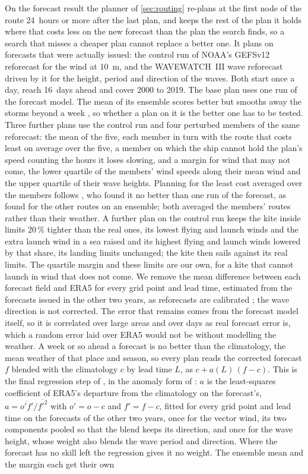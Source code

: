 On the forecast result the planner of \cref{sec:routing} re-plans at the first node of the route 24~hours or more after the last plan, and keeps the rest of the plan it holds where that costs less on the new forecast than the plan the search finds, so a search that misses a cheaper plan cannot replace a better one. It plans on forecasts that were actually issued: the control run of NOAA's GEFSv12 reforecast \citep{guan2022} for the wind at 10~m, and the WAVEWATCH~III wave reforecast driven by it \citep{campos2024} for the height, period and direction of the waves. Both start once a day, reach 16~days ahead and cover 2000 to 2019. The base plan uses one run of the forecast model. The mean of its ensemble scores better but smooths away the storms beyond a week \citep{campos2024}, so whether a plan on it is the better one has to be tested. Three further plans use the control run and four perturbed members of the same reforecast: the mean of the five, each member in turn with the route that costs least on average over the five, a member on which the ship cannot hold the plan's speed counting the hours it loses slowing, and a margin for wind that may not come, the lower quartile of the members' wind speeds along their mean wind and the upper quartile of their wave heights. Planning for the least cost averaged over the members follows \citet{hoffschildt1999}, who found it no better than one run of the forecast, as \citet{saetra2004} found for the other routes on an ensemble; both averaged the members' routes rather than their weather. A further plan on the control run keeps the kite inside limits 20\,\% tighter than the real ones, its lowest flying and launch winds and the extra launch wind in a sea raised and its highest flying and launch winds lowered by that share, its landing limits unchanged; the kite then sails against its real limits. The quartile margin and these limits are our own, for a kite that cannot launch in wind that does not come. We remove the mean difference between each forecast field and ERA5 for every grid point and lead time, estimated from the forecasts issued in the other two years, as reforecasts are calibrated \citep{guan2022}; the wave direction is not corrected. The error that remains comes from the forecast model itself, so it is correlated over large areas and over days as real forecast error is, which a random error laid over ERA5 would not be without modelling the weather. A week or so ahead a forecast is no better than the climatology, the mean weather of that place and season, so every plan reads the corrected forecast $f$ blended with the climatology $c$ by lead time $L$, as $c + a(L)\,(f - c)$. This is the final regression step of \citet{leith1974}, in the anomaly form of \citet{murphy1989}: $a$ is the least-squares coefficient of ERA5's departure from the climatology on the forecast's, $a = \overline{o'f'}/\overline{f'^2}$ with $o' = o - c$ and $f' = f - c$, fitted for every grid point and lead time on the forecasts of the other two years, once for the vector wind, its two components pooled so that the blend keeps its direction, and once for the wave height, whose weight also blends the wave period and direction. Where the forecast has no skill left the regression gives it no weight. The ensemble mean and the margin each get their own 